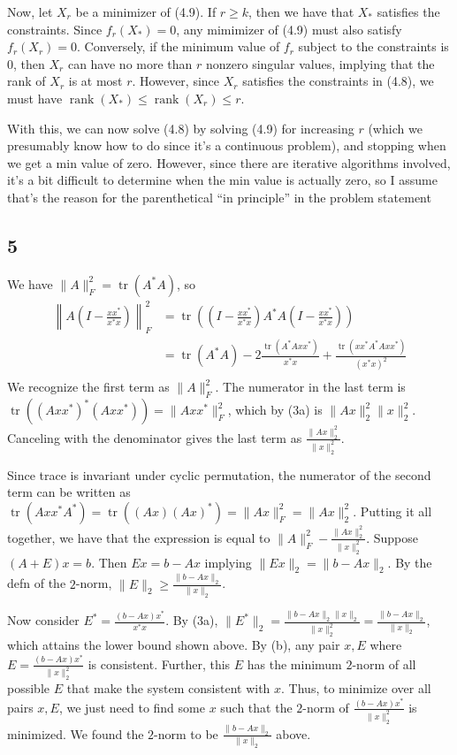\documentclass{article}
\DeclareMathOperator{\rank}{rank}
\DeclareMathOperator{\tr}{tr}
\begin{document}
Now, let $X_r$ be a minimizer of (4.9). If $r\geq k$, then we have that $X_*$ satisfies the constraints. Since $f_r(X_*)=0$, any mimimizer of (4.9) must also satisfy $f_r(X_r)=0$. Conversely, if the minimum value of $f_r$ subject to the constraints is $0$, then $X_r$ can have no more than $r$ nonzero singular values, implying that the rank of $X_r$ is at most $r$. However, since $X_r$ satisfies the constraints in (4.8), we must have $\rank(X_*)\leq\rank(X_r)\leq r$.

With this, we can now solve (4.8) by solving (4.9) for increasing $r$ (which we presumably know how to do since it's a continuous problem), and stopping when we get a min value of zero. However, since there are iterative algorithms involved, it's a bit difficult to determine when the min value is actually zero, so I assume that's the reason for the parenthetical ``in principle'' in the problem statement
\subsection*{5}
We have $\|A\|_F^2=\tr(A^*A)$, so
\begin{align*}
    \left\|A\left(I-\frac{xx^*}{x^*x}\right)\right\|_F^2&=\tr\left(\left(I-\frac{xx^*}{x^*x}\right)A^*A\left(I-\frac{xx^*}{x^*x}\right)\right)\\
                                                    &=\tr(A^*A)-2\frac{\tr(A^*Axx^*)}{x^*x}+\frac{\tr(xx^*A^*Axx^*)}{(x^*x)^2}\\
\end{align*}
We recognize the first term as $\|A\|_F^2$. The numerator in the last term is $\tr((Axx^*)^*(Axx^*))=\|Axx^*\|_F^2$, which by (3a) is $\|Ax\|_2^2\|x\|_2^2$. Canceling with the denominator gives the last term as $\frac{\|Ax\|_2^2}{\|x\|_2^2}$.

Since trace is invariant under cyclic permutation, the numerator of the second term can be written as $\tr(Axx^*A^*)=\tr((Ax)(Ax)^*)=\|Ax\|_F^2=\|Ax\|_2^2$. Putting it all together, we have that the expression is equal to $\|A\|_F^2-\frac{\|Ax\|_2^2}{\|x\|_2^2}$.
Suppose $(A+E)x=b$. Then $Ex=b-Ax$ implying $\|Ex\|_2=\|b-Ax\|_2$. By the defn of the $2$-norm, $\|E\|_2\geq\frac{\|b-Ax\|_2}{\|x\|_2}$. 

Now consider $E^*=\frac{(b-Ax)x^*}{x^*x}$. By (3a), $\|E^*\|_2=\frac{\|b-Ax\|_2\|x\|_2}{\|x\|_2^2}=\frac{\|b-Ax\|_2}{\|x\|_2}$, which attains the lower bound shown above. 
By (b), any pair $x,E$ where $E=\frac{(b-Ax)x^*}{\|x\|_2^2}$ is consistent. Further, this $E$ has the minimum $2$-norm of all possible $E$ that make the system consistent with $x$. Thus, to minimize over all pairs $x,E$, we just need to find some $x$ such that the $2$-norm of $\frac{(b-Ax)x^*}{\|x\|_2^2}$ is minimized. We found the $2$-norm to be $\frac{\|b-Ax\|_2}{\|x\|_2}$ above. 
\end{document}
